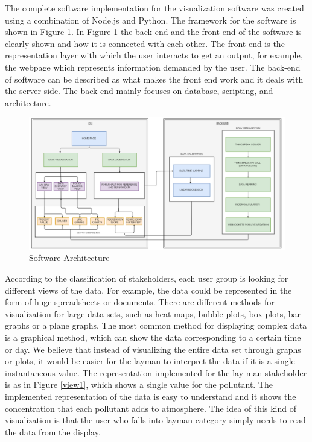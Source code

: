 The complete software implementation for the visualization software was created using a combination of Node.js and Python. The framework for the software is shown in Figure \ref{frameworksoft}. In Figure \ref{frameworksoft} the back-end and the front-end of the software is clearly shown and how it is connected with each other. The front-end is the representation layer with which the user interacts to get an output, for example, the webpage which represents information demanded by the user. The back-end of software can be described as what makes the front end work and it deals with the server-side. The back-end mainly  focuses on database, scripting, and architecture.
\begin{figure}[h]
  \begin{center}
  \includegraphics[scale=0.58]{./images/figure33.png}
  \end{center}
  \caption{Software Architecture}
  \label{frameworksoft}
\end{figure}

\hspace{1 cm}


According to the classification of stakeholders, each user group is looking for different views of the data. For example, the data could be represented in the form of huge spreadsheets or documents. There are different methods for visualization for large data sets, such as heat-maps, bubble plots, box plots, bar graphs or a plane graphs. The most common method for displaying complex data is a graphical method, which can show the data corresponding to a certain time or day. We believe that instead of visualizing the entire data set through graphs or plots, it would be easier for the layman to interpret the data if it is a single instantaneous value. The  representation implemented for the lay man stakeholder is as in Figure \ref{view1}, which shows a single value for the pollutant. The implemented representation of the data is easy to understand and it shows the concentration that each pollutant adds to atmosphere. The idea of this kind of visualization is that the user who falls into layman category simply needs to read the data from the display.

